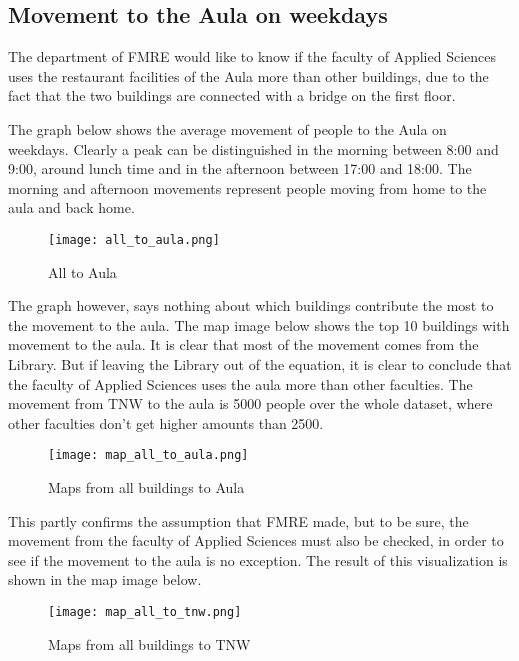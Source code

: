 \subsection{Movement to the Aula on weekdays}

The department of FMRE would like to know if the faculty of Applied Sciences uses the restaurant facilities of the Aula more than other buildings, due to the fact that the two buildings are connected with a bridge on the first floor.

The graph below shows the average movement of people to the Aula on weekdays. Clearly a peak can be distinguished in the morning between 8:00 and 9:00, around lunch time and in the afternoon between 17:00 and 18:00. The morning and afternoon movements represent people moving from home to the aula and back home.
\begin{figure}[H]
\centering
\texttt{[image: all\_to\_aula.png]}
\captionsetup{justification=centering}
\caption{All to Aula}
\label{figure:all to aula}
\end{figure}

The graph however, says nothing about which buildings contribute the most to the movement to the aula. The map image below shows the top 10 buildings with movement to the aula. It is clear that most of the movement comes from the Library. But if leaving the Library out of the equation, it is clear to conclude that the faculty of Applied Sciences uses the aula more than other faculties. The movement from TNW to the aula is 5000 people over the whole dataset, where other faculties don’t get higher amounts than 2500. 

\begin{figure}[H]
\centering
\texttt{[image: map\_all\_to\_aula.png]}
\captionsetup{justification=centering}
\caption{Maps from all buildings to Aula}
\label{figure:all to aula maps}
\end{figure}

This partly confirms the assumption that FMRE made, but to be sure, the movement from the faculty of Applied Sciences must also be checked, in order to see if the movement to the aula is no exception. The result of this visualization is shown in the map image below.

\begin{figure}[H]
\centering
\texttt{[image: map\_all\_to\_tnw.png]}
\captionsetup{justification=centering}
\caption{Maps from all buildings to TNW}
\label{figure:all to TNW maps}
\end{figure} 

